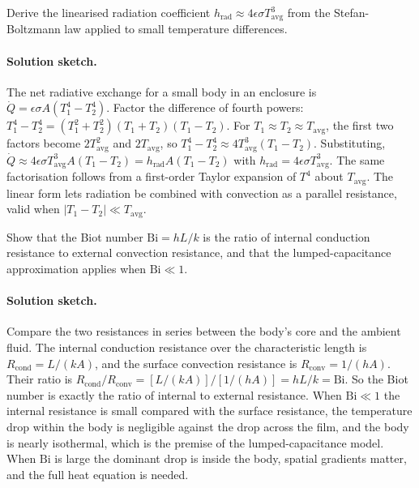 \begin{exercise}
Derive the linearised radiation coefficient $h_{\text{rad}} \approx
4 \epsilon \sigma T_{\text{avg}}^3$ from the Stefan-Boltzmann law
applied to small temperature differences.
\paragraph{Solution sketch.} The net radiative exchange for a small body
in an enclosure is $\dot{Q} = \epsilon\sigma A(T_1^4 - T_2^4)$. Factor
the difference of fourth powers: $T_1^4 - T_2^4 = (T_1^2 + T_2^2)(T_1 +
T_2)(T_1 - T_2)$. For $T_1 \approx T_2 \approx T_{\text{avg}}$, the first
two factors become $2T_{\text{avg}}^2$ and $2T_{\text{avg}}$, so $T_1^4
- T_2^4 \approx 4T_{\text{avg}}^3(T_1 - T_2)$. Substituting, $\dot{Q}
\approx 4\epsilon\sigma T_{\text{avg}}^3 A(T_1 - T_2) = h_{\text{rad}} A
(T_1 - T_2)$ with $h_{\text{rad}} = 4\epsilon\sigma T_{\text{avg}}^3$.
The same factorisation follows from a first-order Taylor expansion of
$T^4$ about $T_{\text{avg}}$. The linear form lets radiation be combined
with convection as a parallel resistance, valid when $|T_1 - T_2| \ll
T_{\text{avg}}$.
\end{exercise}

\begin{exercise}
Show that the Biot number $\text{Bi} = hL/k$ is the ratio of internal
conduction resistance to external convection resistance, and that
the lumped-capacitance approximation applies when $\text{Bi} \ll 1$.
\paragraph{Solution sketch.} Compare the two resistances in series
between the body's core and the ambient fluid. The internal conduction
resistance over the characteristic length is $R_{\text{cond}} = L/(k A)$,
and the surface convection resistance is $R_{\text{conv}} = 1/(h A)$.
Their ratio is $R_{\text{cond}}/R_{\text{conv}} = [L/(kA)]/[1/(hA)] =
hL/k = \text{Bi}$. So the Biot number is exactly the ratio of internal
to external resistance. When $\text{Bi} \ll 1$ the internal resistance is
small compared with the surface resistance, the temperature drop within
the body is negligible against the drop across the film, and the body is
nearly isothermal, which is the premise of the lumped-capacitance model.
When $\text{Bi}$ is large the dominant drop is inside the body, spatial
gradients matter, and the full heat equation is needed.
\end{exercise}

